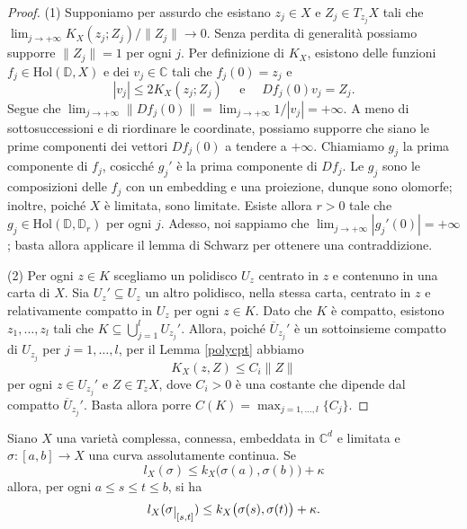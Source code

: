 \begin{proof}
    (1) Supponiamo per assurdo che esistano $z_j \in X$ e $Z_j \in T_{z_j}X$ tali che $\displaystyle \lim_{j \longrightarrow +\infty} K_X(z_j;Z_j)/\|Z_j\| \longrightarrow 0$. Senza perdita di generalità possiamo supporre $\|Z_j\|=1$ per ogni $j$. Per definizione di $K_X$, esistono delle funzioni $f_j\in\text{Hol}(\mathbb{D},X)$ e dei $v_j \in \mathbb{C}$ tali che $f_j(0)=z_j$ e
    $$|v_j| \le 2K_X(z_j;Z_j)\quad\text{ e }\quad Df_j(0)v_j=Z_j.$$
    Segue che $\displaystyle \lim_{j \longrightarrow +\infty}\|Df_j(0)\|=\lim_{j \longrightarrow +\infty}1/|v_j|=+\infty$. A meno di sottosuccessioni e di riordinare le coordinate, possiamo supporre che siano le prime componenti dei vettori $Df_j(0)$ a tendere a $+\infty$. Chiamiamo $g_j$ la prima componente di $f_j$, cosicché $g_j'$ è la prima componente di $Df_j$. Le $g_j$ sono le composizioni delle $f_j$ con un embedding e una proiezione, dunque sono olomorfe; inoltre, poiché $X$ è limitata, sono limitate. Esiste allora $r>0$ tale che $g_j \in \text{Hol}(\mathbb{D},\mathbb{D}_r)$ per ogni $j$. Adesso, noi sappiamo che $\displaystyle\lim_{j\longrightarrow +\infty} |g_j'(0)|=+\infty$; basta allora applicare il lemma di Schwarz per ottenere una contraddizione.

    (2) Per ogni $z \in K$ scegliamo un polidisco $U_z$ centrato in $z$ e contenuno in una carta di $X$. Sia $U_z'\subseteq U_z$ un altro polidisco, nella stessa carta, centrato in $z$ e relativamente compatto in $U_z$ per ogni $z \in K$. Dato che $K$ è compatto, esistono $z_1,\dots,z_l$ tali che $K\subseteq\displaystyle\bigcup_{j=1}^l U_{z_j}'$. Allora, poiché $\overline{U}_{z_j}'$ è un sottoinsieme compatto di $U_{z_j}$ per $j=1,\dots,l$, per il Lemma \ref{polycpt} abbiamo
    $$K_X(z,Z) \le C_i\|Z\|$$
    per ogni $z \in U_{z_j}'$ e $Z\in T_zX$, dove $C_i>0$ è una costante che dipende dal compatto $\overline{U}_{z_j}'$. Basta allora porre $C(K)=\displaystyle\max_{j=1,\dots,l}\{C_j\}$.
\end{proof}

\begin{lm} \label{restrdis}
    Siano $X$ una varietà complessa, connessa, embeddata in $\mathbb{C}^d$ e limitata e $\sigma:[a,b] \longrightarrow X$ una curva assolutamente continua. Se
    $$l_X(\sigma) \le k_X\big(\sigma(a),\sigma(b)\big)+\kappa$$
    allora, per ogni $a \le s \le t \le b$, si ha
    $$l_X(\sigma\restrict{[s,t]}) \le k_X\big(\sigma(s),\sigma(t)\big)+\kappa.$$
\end{lm}

